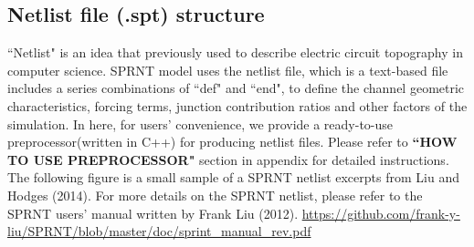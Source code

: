 \documentclass[12pt, letterpaper]{article}
\begin{document}
\subsection{Netlist file (.spt) structure}
\begin{flushleft} %
``Netlist" is an idea that previously used to describe electric circuit topography in computer science. SPRNT model uses the netlist file, which is a text-based file includes a series combinations of ``def" and ``end", to define the channel geometric characteristics, forcing terms, junction contribution ratios and other factors of the simulation.\newline
In here, for users' convenience, we provide a ready-to-use preprocessor(written in C++) for producing netlist files. Please refer to \textbf{``HOW TO USE PREPROCESSOR"} section in appendix for detailed instructions.
The following figure is a small sample of a SPRNT netlist excerpts from Liu and Hodges (2014). For more details on the SPRNT netlist, please refer to the SPRNT users' manual written by Frank Liu (2012). \url{https://github.com/frank-y-liu/SPRNT/blob/master/doc/sprint_manual_rev.pdf}
\end{flushleft} %



\end{document}
